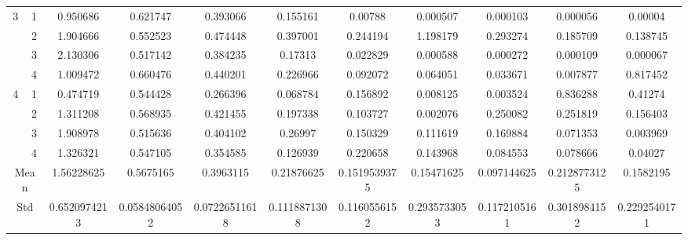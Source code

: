 \documentclass[draft,dvipsnames]{drexel-thesis}
\begin{document}
\begin{thesis}
\begin{table}[!t]
{\begin{tabular}{|c|c|c|c|c|c|c|c|c|c|c|}
\multirow{4}{*}{3}    & 1                   & 0.950686     & 0.621747      & 0.393066      & 0.155161     & 0.00788      & 0.000507     & 0.000103     & 0.000056     & 0.00004      \\ \cline{2-11}
                      & 2                   & 1.904666     & 0.552523      & 0.474448      & 0.397001     & 0.244194     & 1.198179     & 0.293274     & 0.185709     & 0.138745     \\ \cline{2-11}
                      & 3                   & 2.130306     & 0.517142      & 0.384235      & 0.17313      & 0.022829     & 0.000588     & 0.000272     & 0.000109     & 0.000067     \\ \cline{2-11}
                      & 4                   & 1.009472     & 0.660476      & 0.440201      & 0.226966     & 0.092072     & 0.064051     & 0.033671     & 0.007877     & 0.817452     \\ \hline
\multirow{4}{*}{4}    & 1                   & 0.474719     & 0.544428      & 0.266396      & 0.068784     & 0.156892     & 0.008125     & 0.003524     & 0.836288     & 0.41274      \\ \cline{2-11}
                      & 2                   & 1.311208     & 0.568935      & 0.421455      & 0.197338     & 0.103727     & 0.002076     & 0.250082     & 0.251819     & 0.156403     \\ \cline{2-11}
                      & 3                   & 1.908978     & 0.515636      & 0.404102      & 0.26997      & 0.150329     & 0.111619     & 0.169884     & 0.071353     & 0.003969     \\ \cline{2-11}
                      & 4                   & 1.326321     & 0.547105      & 0.354585      & 0.126939     & 0.220658     & 0.143968     & 0.084553     & 0.078666     & 0.04027      \\ \hline
\multicolumn{2}{|c|}{Mean}                  & 1.56228625   & 0.5675165     & 0.3963115     & 0.21876625   & 0.1519539375 & 0.15471625   & 0.097144625  & 0.2128773125 & 0.1582195    \\ \hline
\multicolumn{2}{|c|}{Std}                   & 0.6520974213 & 0.05848064052 & 0.07226511618 & 0.1118871308 & 0.1160556152 & 0.2935733053 & 0.1172105161 & 0.3018984152 & 0.2292540171 \\ \hline
\end{tabular}}
\end{table}


\end{thesis}
\end{document}
